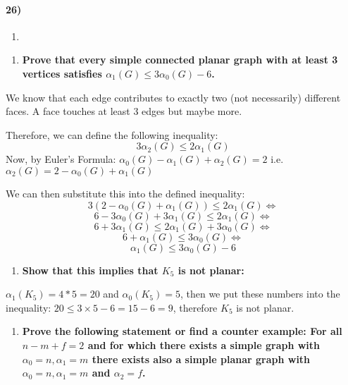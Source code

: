 \documentclass[
]{article}
\providecommand{\tightlist}{%
  \setlength{\itemsep}{0pt}\setlength{\parskip}{0pt}}
\begin{document}
\hypertarget{section}{%
\paragraph{26)}\label{section}}

\begin{enumerate}
\def\labelenumi{(\alph{enumi})}
\tightlist
\item
\end{enumerate}

\begin{enumerate}
\def\labelenumi{\arabic{enumi})}
\tightlist
\item
  \textbf{Prove that every simple connected planar graph with at least 3
  vertices satisfies \(\alpha_1(G) \leq 3\alpha_0(G) - 6\).}
\end{enumerate}

We know that each edge contributes to exactly two (not necessarily)
different faces. A face touches at least 3 edges but maybe more.

Therefore, we can define the following inequality: \[
3 \alpha_2(G) \leq 2 \alpha_1(G)
\] Now, by Euler's Formula:
\(\alpha_0(G) - \alpha_1(G) + \alpha_2(G) = 2\)
i.e.~\(\alpha_2(G) = 2- \alpha_0(G) + \alpha_1(G)\)

We can then substitute this into the defined inequality: \[
3(2 - \alpha_0(G) + \alpha_1(G)) \leq 2\alpha_1(G) \Leftrightarrow
\] \[
6 - 3\alpha_0(G) + 3\alpha_1(G) \leq 2\alpha_1(G) \Leftrightarrow
\] \[
6 + 3 \alpha_1(G) \leq 2 \alpha_1(G) + 3\alpha_0(G) \Leftrightarrow
\] \[
6 + \alpha_1(G) \leq 3 \alpha_0(G) \Leftrightarrow
\] \[
\alpha_1(G) \leq 3\alpha_0(G) - 6
\]

\begin{enumerate}
\def\labelenumi{\arabic{enumi})}
\setcounter{enumi}{1}
\tightlist
\item
  \textbf{Show that this implies that \(K_5\) is not planar:}
\end{enumerate}

\(\alpha_1(K_5) = 4 * 5 = 20\) and \(\alpha_0(K_5) = 5\), then we put
these numbers into the inequality:
\(20 \leq 3 \times 5 - 6 = 15 - 6 = 9\), therefore \(K_5\) is not
planar.

\begin{enumerate}
\def\labelenumi{(\alph{enumi})}
\setcounter{enumi}{1}
\tightlist
\item
  \textbf{Prove the following statement or find a counter example: For
  all \(n - m + f = 2\) and for which there exists a simple graph with
  \(\alpha_0 = n, \alpha_1 = m\) there exists also a simple planar graph
  with \(\alpha_0 = n, \alpha_1 = m\) and \(\alpha_2 = f\).}
\end{enumerate}
\end{document}
